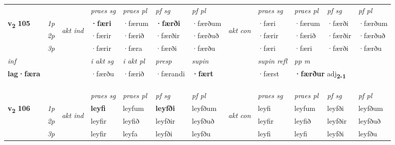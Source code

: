 \begin{longtable}[l]{X>{\footnotesize\itshape}llXXXXlXXXX}
 & &   & \textit{praes sg}  & \textit{praes pl}    & \textit{ pf sg} & \textit{pf pl} & & \textit{praes sg}  & \textit{praes pl}    & \textit{pf sg} & \textit{pf pl }  \\ \cmidrule{4-7} \cmidrule{9-12}
 \multirow{2}{*}{{{\textbf{v{\textsubscript{2}}} \Large{\textbf{105}}}}}  & 1p & \multirow{3}{*}{\begin{turn}{90}\textit{akt ind}\end{turn}} & \textbf{·færi} & ·færum & \textbf{·færði} & ·færðum & \multirow{3}{*}{\begin{turn}{90}\textit{akt con}\end{turn}} &·færi & ·færum & ·færði & ·færðum\\*
 & 2p &  &  ·færir  & ·færið & ·færðir & ·færðuð & & ·færir & ·færið & ·færðir & ·færðuð \\*
 & 3p &  & ·færir & ·færa & ·færði & ·færðu & & ·færi & ·færi& ·færði & ·færðu \\*
\cmidrule{4-7} \cmidrule{9-12}

   {\textit{inf}} & &  & \textit{i akt sg} & \textit{i akt pl}   & \textit{presp} & \textit{supin} && \textit{supin refl} & \textit{pp m} \\*
  {\textbf{lag\allowbreak ·færa}} & && ·færðu  & ·færið   & ·færandi &  \textbf{·fært} && ·færst & \multicolumn{2}{l}{\textbf{·færður} adj\textbf{\textsubscript{2-1}}} \\*

\midrule
& \\*
  & \\*
  & \\
    \midrule
 & &   & \textit{praes sg}  & \textit{praes pl}    & \textit{ pf sg} & \textit{pf pl} & & \textit{praes sg}  & \textit{praes pl}    & \textit{pf sg} & \textit{pf pl }  \\ \cmidrule{4-7} \cmidrule{9-12}
 \multirow{2}{*}{{{\textbf{v{\textsubscript{2}}} \Large{\textbf{106}}}}}  & 1p & \multirow{3}{*}{\begin{turn}{90}\textit{akt ind}\end{turn}} & \textbf{leyfi} & leyfum & \textbf{leyfði} & leyfðum & \multirow{3}{*}{\begin{turn}{90}\textit{akt con}\end{turn}} &leyfi & leyfum & leyfði & leyfðum\\*
 & 2p &  &  leyfir  & leyfið & leyfðir & leyfðuð & & leyfir & leyfið & leyfðir & leyfðuð \\*
 & 3p &  & leyfir & leyfa & leyfði & leyfðu & & leyfi & leyfi& leyfði & leyfðu \\*
\cmidrule{4-7} \cmidrule{9-12}


\end{longtable}
